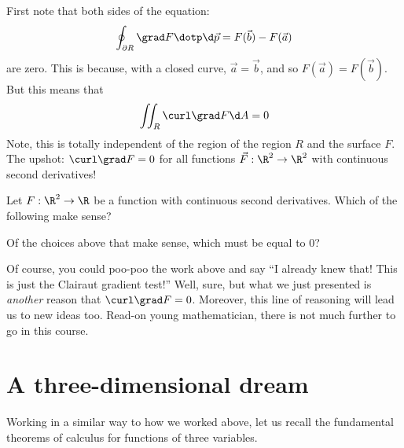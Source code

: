 \documentclass{ximera}
\begin{document}
First note that both sides of the equation:
\[
\oint_{\partial R} \grad F \dotp \d \vec{p} = F(\vec{b}) - F(\vec{a})
\]
are zero. This is because, with a closed curve, $\vec{a}=\vec{b}$, and
so $F(\vec{a}) = F(\vec{b})$. But this means that
\[
\iint_R \curl \grad F \d A = 0
\]
Note, this is totally independent of the region of the region $R$ and
the surface $F$. The upshot: $\curl\grad F = 0$ for all functions
$\vec{F}:\R^2\to\R^2$ with continuous second derivatives!

\begin{question}
  Let $F:\R^2\to \R$ be a function with continuous second
  derivatives. Which of the following make sense?
  \begin{selectAll}
  \end{selectAll}
  \begin{question}
    Of the choices above that make sense, which must be equal to $0$?
    \begin{prompt}
    \begin{selectAll}
    \end{selectAll}
    \end{prompt}
    \end{question}
\end{question}

Of course, you could poo-poo the work above and say ``I already knew
that!  This is just the Clairaut gradient test!'' Well, sure, but
what we just presented is \textit{another} reason that $\curl \grad F
= 0$. Moreover, this line of reasoning will lead us to new ideas
too. Read-on young mathematician, there is not much further to go in
this course.



\section{A three-dimensional dream}

Working in a similar way to how we worked above, let us recall the fundamental theorems of calculus for functions of three variables.
\end{document}
